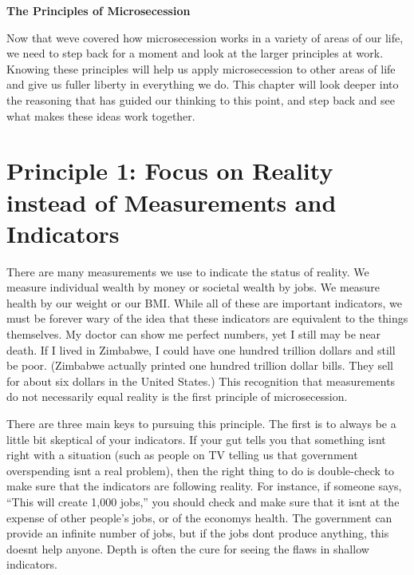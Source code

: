 \documentclass[letterpaper]{article}
\title{}
\begin{document}
\clearpage\setcounter{page}{1}\pagestyle{Standard}
{\centering{}\bfseries\color{black}
The Principles of Microsecession
\par}

{\color{black}
Now that we{\textquotesingle}ve covered how microsecession works in a
variety of areas of our life, we need to step back for a moment and
look at the larger principles at work. Knowing these principles will
help us apply microsecession to other areas of life and give us fuller
liberty in everything we do.  This chapter will look deeper into the
reasoning that has guided our thinking to this point, and step back and
see what makes these ideas work together.}

\section{Principle 1: Focus on Reality instead of Measurements and
Indicators}
{\color{black}
There are many measurements we use to indicate the status of reality. We
measure individual wealth by money or societal wealth by jobs. We
measure health by our weight
or\textcolor[rgb]{0.32941177,0.5529412,0.83137256}{ our BMI}. While all
of these are important indicators, we must be forever wary
\textcolor[rgb]{0.32941177,0.5529412,0.83137256}{of the idea }that
these indicators are equivalent to the things themselves. My doctor can
show me perfect numbers, yet I still may be near death. If I lived in
Zimbabwe, I could have one hundred trillion dollars and still be poor.
(Zimbabwe actually printed one hundred trillion dollar bills. They sell
for about six dollars in the United States.)
\textcolor[rgb]{0.32941177,0.5529412,0.83137256}{This recognition that
measurements do not necessarily equal reality is the first principle of
microsecession.}}

{\color{black}
There are three main keys to pursuing this principle. The first is to
always be a little bit skeptical of your indicators. If your gut tells
you that something isn{\textquotesingle}t right with a situation (such
as people on TV telling us that government overspending
isn{\textquotesingle}t a real problem), then the right thing to do is
double-check to make sure that the indicators are following reality.
For instance, if someone says, “This will create 1,000 jobs,” you
should check and make sure that it isn{\textquotesingle}t at the
expense of other people’s jobs, or of the economy{\textquotesingle}s
health. The government can provide an infinite number of jobs, but if
\textcolor[rgb]{0.32941177,0.5529412,0.83137256}{the jobs}
don{\textquotesingle}t produce anything, this doesn{\textquotesingle}t
help anyone. Depth is often the cure for seeing the flaws in shallow
indicators.}
\end{document}
